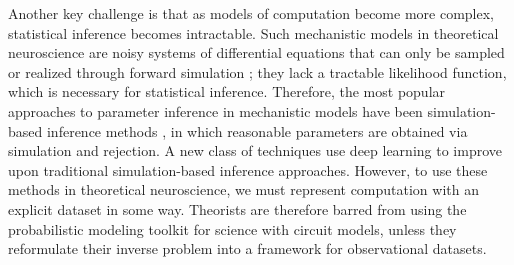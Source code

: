 \documentclass[11pt]{article}
\begin{document}
Another key challenge is that as models of computation become more complex, statistical inference becomes intractable.
Such mechanistic models in theoretical neuroscience are noisy systems of differential equations that can only be sampled or realized through forward simulation \cite{dayan2003theoretical, izhikevich2007dynamical}; they lack a tractable likelihood function, which is necessary for statistical inference.
Therefore, the most popular approaches to parameter inference in mechanistic models have been simulation-based inference methods \cite{sisson2007sequential, liepe2014framework}, in which reasonable parameters are obtained via simulation and rejection.
A new class of techniques \cite{gonccalves2019training, papamakarios2019sequential, hermans2020likelihood} use deep learning to improve upon traditional simulation-based inference approaches.
However, to use these methods in theoretical neuroscience, we must represent computation with an explicit dataset in some way.
Theorists are therefore barred from using the probabilistic modeling toolkit for science with circuit models, unless they reformulate their inverse problem into a framework for observational datasets.

%
\end{document}
